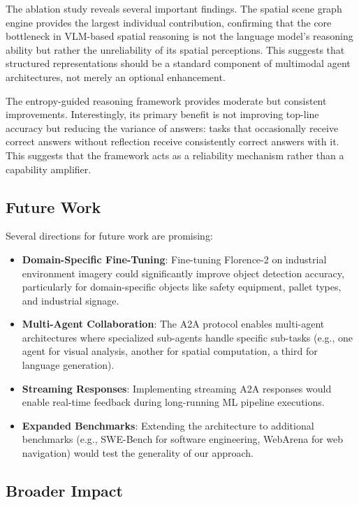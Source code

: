 \documentclass[11pt]{article}
\begin{document}
The ablation study reveals several important findings. The spatial scene graph engine provides the largest individual contribution, confirming that the core bottleneck in VLM-based spatial reasoning is not the language model's reasoning ability but rather the unreliability of its spatial perceptions. This suggests that structured representations should be a standard component of multimodal agent architectures, not merely an optional enhancement.

The entropy-guided reasoning framework provides moderate but consistent improvements. Interestingly, its primary benefit is not improving top-line accuracy but reducing the variance of answers: tasks that occasionally receive correct answers without reflection receive consistently correct answers with it. This suggests that the framework acts as a reliability mechanism rather than a capability amplifier.

\subsection{Future Work}

Several directions for future work are promising:

\begin{itemize}[leftmargin=*,itemsep=2pt]
  \item \textbf{Domain-Specific Fine-Tuning}: Fine-tuning Florence-2 on industrial environment imagery could significantly improve object detection accuracy, particularly for domain-specific objects like safety equipment, pallet types, and industrial signage.
  \item \textbf{Multi-Agent Collaboration}: The A2A protocol enables multi-agent architectures where specialized sub-agents handle specific sub-tasks (e.g., one agent for visual analysis, another for spatial computation, a third for language generation).
  \item \textbf{Streaming Responses}: Implementing streaming A2A responses would enable real-time feedback during long-running ML pipeline executions.
  \item \textbf{Expanded Benchmarks}: Extending the architecture to additional benchmarks (e.g., SWE-Bench for software engineering, WebArena for web navigation) would test the generality of our approach.
\end{itemize}

\subsection{Broader Impact}
\end{document}
